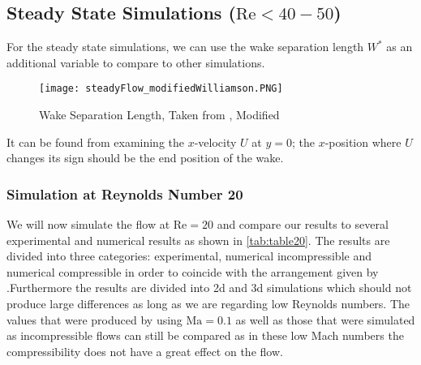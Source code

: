 	\subsection{Steady State Simulations ($\text{Re} < 40-50$)}
	For the steady state simulations, we can use the wake separation length $W^*$ as an additional variable to compare to other simulations.
			\begin{figure}[htp]
				\centering
				\texttt{[image: steadyFlow\_modifiedWilliamson.PNG]}
				\caption{Wake Separation Length, Taken from \cite{williamson1996vortex}, Modified }
				\label{fig:wakeSeparation}
			\end{figure} 
	It can be found from examining the $x$-velocity $U$ at $y=0$; the $x$-position where $U$ changes its sign should be the end position of the wake.

	\subsubsection{Simulation at Reynolds Number 20}
	We will now simulate the flow at $\text{Re}=20$ and compare our results to several experimental and numerical results as shown in \cref{tab:table20}. The results are divided into three categories: experimental, numerical incompressible and numerical compressible in order to coincide with the arrangement given by \textcite{ayers}.Furthermore the results are divided into \gls{2d} and \gls{3d} simulations which should not produce large differences as long as we are regarding low Reynolds numbers. The values that were produced by \textcite{brehm2015locally} using $\text{Ma} = 0.1$ as well as those that were simulated as incompressible flows can still be compared as in these low Mach numbers the compressibility does not have a great effect on the flow.

